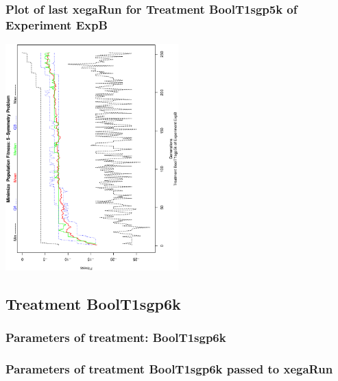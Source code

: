\documentclass[18pt,c]{beamer}
\makeatletter
\def\beamer@writeslidentry@miniframesoff{%
  \expandafter\beamer@ifempty\expandafter{\beamer@framestartpage}{}%
  {%
   \clearpage\beamer@notesactions%
  }
}
\newcommand*{\miniframesoff}{\let\beamer@writeslidentry=\beamer@writeslidentry@miniframesoff}
\makeatother
\begin{document}
 \begin{frame}
 \frametitle{ Plot of last xegaRun for Treatment BoolT1sgp5k of Experiment ExpB }
 \begin{center}
\includegraphics[width=0.5\textwidth, angle=-90]
{ExpBPlotPopStatsFigure008.eps}
 \end{center}
 \label{report/ExpBPlotPopStatsFigure008.eps}  
 \end{frame}

\miniframesoff
\subsection{Treatment BoolT1sgp6k}

 \begin{frame}
 \fontsize{8pt}{9pt}\selectfont
 \frametitle{  Parameters of treatment: BoolT1sgp6k 
 }

 \label{ExpBtParmTable036.tex}  
 \end{frame}


 \begin{frame}
 \fontsize{8pt}{9pt}\selectfont
 \frametitle{  Parameters of treatment BoolT1sgp6k passed to xegaRun
 }

 \label{ExpBtParmTable037.tex}  
 \end{frame}
\end{document}
